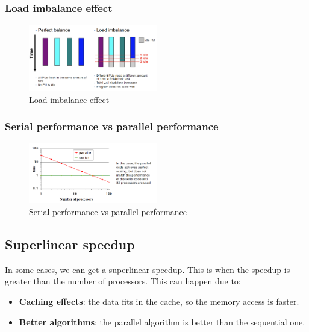 \subsubsection{Load imbalance effect}

\begin{figure}[H]
    \centering
    \includegraphics[width=0.5\textwidth]{figures/load_imbalance.png}
    \caption{Load imbalance effect}
    \label{fig:load_imbalance}
\end{figure}

\subsubsection{Serial performance vs parallel performance}

\begin{figure}[H]
    \centering
    \includegraphics[width=0.5\textwidth]{figures/serial_vs_parallel.png}
    \caption{Serial performance vs parallel performance}
    \label{fig:serial_vs_parallel}
\end{figure}

\subsection{Superlinear speedup}

In some cases, we can get a superlinear speedup. This is when the speedup is greater than
the number of processors. This can happen due to:

\begin{itemize}
    \item \textbf{Caching effects}: the data fits in the cache, so the memory access is
    faster.
    
    \item \textbf{Better algorithms}: the parallel algorithm is better than the sequential
    one.
\end{itemize}

